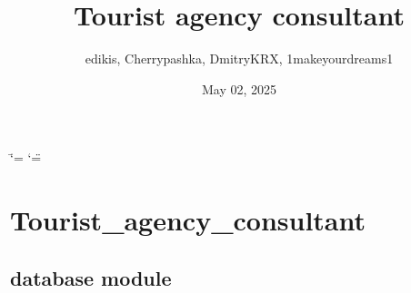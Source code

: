 \documentclass[letterpaper,10pt,english]{sphinxmanual}
\title{Tourist agency consultant}
\date{May 02, 2025}
\author{edikis, Cherry\sphinxhyphen{}pashka, DmitryKRX, 1makeyourdreams1}
\begin{document}
\ifdefined\shorthandoff
  \ifnum\catcode`\=\string=\active\shorthandoff{=}\fi
  \ifnum\catcode`\"=\active{}\fi
\fi

\pagestyle{empty}
\sphinxmaketitle
\pagestyle{plain}
\sphinxtableofcontents
\pagestyle{normal}
\label{\detokenize{index::doc}}


\sphinxstepscope


\chapter{Tourist\_agency\_consultant}
\label{\detokenize{modules:tourist-agency-consultant}}\label{\detokenize{modules::doc}}
\sphinxstepscope


\section{database module}
\label{\detokenize{database:module-database}}\label{\detokenize{database:database-module}}\label{\detokenize{database::doc}}
\end{document}
